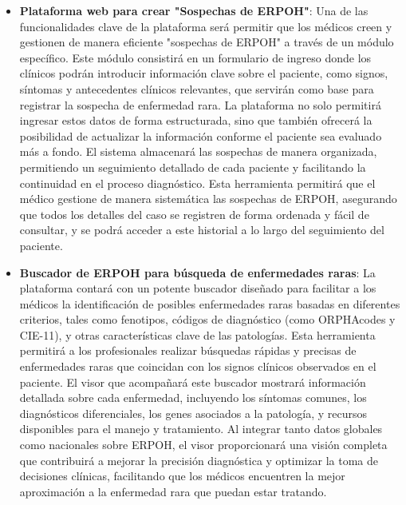 \documentclass{article}
\begin{document}
\begin{itemize}[leftmargin=1.2em]

\item \textbf{Plataforma web para crear  "Sospechas de ERPOH"}:
Una de las funcionalidades clave de la plataforma será permitir que los médicos creen y gestionen de manera eficiente "sospechas de ERPOH" a través de un módulo específico. Este módulo consistirá en un formulario de ingreso donde los clínicos podrán introducir información clave sobre el paciente, como signos, síntomas y antecedentes clínicos relevantes, que servirán como base para registrar la sospecha de enfermedad rara. La plataforma no solo permitirá ingresar estos datos de forma estructurada, sino que también ofrecerá la posibilidad de actualizar la información conforme el paciente sea evaluado más a fondo. El sistema almacenará las sospechas de manera organizada, permitiendo un seguimiento detallado de cada paciente y facilitando la continuidad en el proceso diagnóstico. Esta herramienta permitirá que el médico gestione de manera sistemática las sospechas de ERPOH, asegurando que todos los detalles del caso se registren de forma ordenada y fácil de consultar, y se podrá acceder a este historial a lo largo del seguimiento del paciente.

\item \textbf{Buscador de ERPOH para búsqueda de enfermedades raras}:
La plataforma contará con un potente buscador diseñado para facilitar a los médicos la identificación de posibles enfermedades raras basadas en diferentes criterios, tales como fenotipos, códigos de diagnóstico (como ORPHAcodes y CIE-11), y otras características clave de las patologías. Esta herramienta permitirá a los profesionales realizar búsquedas rápidas y precisas de enfermedades raras que coincidan con los signos clínicos observados en el paciente. El visor que acompañará este buscador mostrará información detallada sobre cada enfermedad, incluyendo los síntomas comunes, los diagnósticos diferenciales, los genes asociados a la patología, y recursos disponibles para el manejo y tratamiento. Al integrar tanto datos globales como nacionales sobre ERPOH, el visor proporcionará una visión completa que contribuirá a mejorar la precisión diagnóstica y optimizar la toma de decisiones clínicas, facilitando que los médicos encuentren la mejor aproximación a la enfermedad rara que puedan estar tratando.


\end{itemize}
\end{document}
